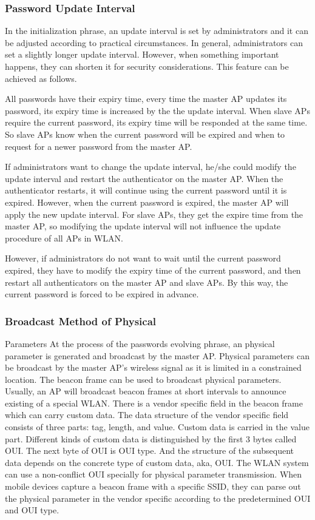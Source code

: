 \subsubsection{Password Update Interval}
In the initialization phrase, an update interval is set by administrators and it can be adjusted according to practical circumstances. In general, administrators can set a slightly longer update interval. However, when something important happens, they can shorten it for security considerations. This feature can be achieved as follows. 

All passwords have their expiry time, every time the master AP updates its password, its expiry time is increased by the the update interval. When slave APs require the current password, its expiry time will be responded at the same time. So slave APs know when the current password will be expired and when to request for a newer password from the master AP. 

If administrators want to change the update interval, he/she could modify the update interval and restart the authenticator on the master AP. When the authenticator restarts, it will continue using the current password until it is expired. However, when the current password is expired, the master AP will apply the new update interval. For slave APs, they get the expire time from the master AP, so modifying the update interval will not influence the update procedure of all APs in WLAN. 


However, if administrators do not want to wait until the current password expired, they have to modify the expiry time of the current password, and then restart all authenticators on the master AP and slave APs. By this way, the current password is forced to be expired in advance. 

\subsubsection{Broadcast Method of Physical} Parameters
At the process of the passwords evolving phrase, an physical parameter is generated and broadcast by the master AP. Physical parameters can be broadcast by the master AP’s wireless signal as it is limited in a constrained location. The beacon frame can be used to broadcast physical parameters. Usually, an AP will broadcast beacon frames at short intervals to announce existing of a special WLAN. There is a vendor specific field in the beacon frame which can carry custom data. The data structure of the vendor specific field consists of three parts: tag, length, and value. Custom data is carried in the value part. Different kinds of custom data is distinguished by the first 3 bytes called OUI. The next byte of OUI is OUI type. And the structure of the subsequent data depends on the concrete type of custom data, aka, OUI. The WLAN system can use a non-conflict OUI specially for physical parameter transmission. When mobile devices capture a beacon frame with a specific SSID, they can parse out the physical parameter in the vendor specific according to the predetermined OUI and OUI type. 

